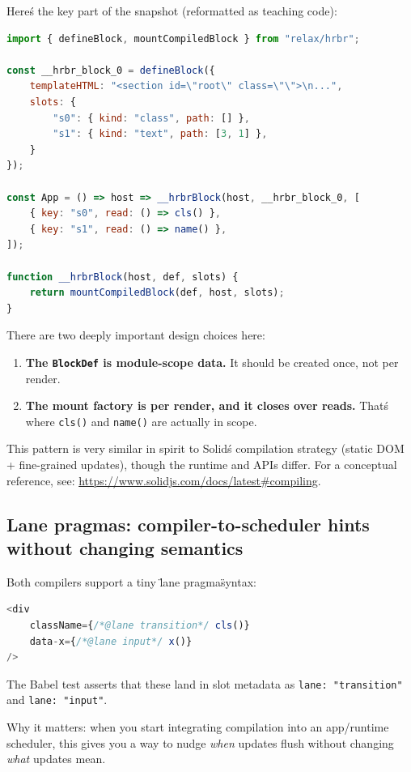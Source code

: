 Here\'s the key part of the snapshot (reformatted as teaching code):

\begin{lstlisting}[language=JavaScript]
import { defineBlock, mountCompiledBlock } from "relax/hrbr";

const __hrbr_block_0 = defineBlock({
	templateHTML: "<section id=\"root\" class=\"\">\n...",
	slots: {
		"s0": { kind: "class", path: [] },
		"s1": { kind: "text", path: [3, 1] },
	}
});

const App = () => host => __hrbrBlock(host, __hrbr_block_0, [
	{ key: "s0", read: () => cls() },
	{ key: "s1", read: () => name() },
]);

function __hrbrBlock(host, def, slots) {
	return mountCompiledBlock(def, host, slots);
}
\end{lstlisting}

There are two deeply important design choices here:

\begin{enumerate}
\item \textbf{The \texttt{BlockDef} is module-scope data.}
	It should be created once, not per render.
\item \textbf{The mount factory is per render, and it closes over reads.}
	That\'s where \texttt{cls()} and \texttt{name()} are actually in scope.
\end{enumerate}

This pattern is very similar in spirit to Solid\'s compilation strategy (static DOM + fine-grained updates), though the runtime and APIs differ.
For a conceptual reference, see:
\href{https://www.solidjs.com/docs/latest\#compiling}{https://www.solidjs.com/docs/latest\#compiling}.

\subsection{Lane pragmas: compiler-to-scheduler hints without changing semantics}

Both compilers support a tiny \"lane pragma\" syntax:

\begin{lstlisting}[language=JavaScript]
<div
	className={/*@lane transition*/ cls()}
	data-x={/*@lane input*/ x()}
/>
\end{lstlisting}

The Babel test asserts that these land in slot metadata as \texttt{lane: "transition"} and \texttt{lane: "input"}.

Why it matters: when you start integrating compilation into an app/runtime scheduler, this gives you a way to nudge \emph{when} updates flush without changing \emph{what} updates mean.

